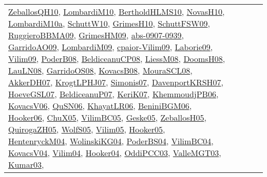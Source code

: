 {\begin{longtable}{lp{3cm}>{\raggedright}p{6cm}>{\raggedright}p{6cm}p{8cm}}
\href{articles/ZeballosQH10.pdf}{ZeballosQH10}\cite{ZeballosQH10}, \href{papers/LombardiM10.pdf}{LombardiM10}\cite{LombardiM10}, \href{papers/BertholdHLMS10.pdf}{BertholdHLMS10}\cite{BertholdHLMS10}, \href{articles/NovasH10.pdf}{NovasH10}\cite{NovasH10}, \href{articles/LombardiM10a.pdf}{LombardiM10a}\cite{LombardiM10a}, \href{papers/SchuttW10.pdf}{SchuttW10}\cite{SchuttW10}, \href{papers/GrimesH10.pdf}{GrimesH10}\cite{GrimesH10}, \href{papers/SchuttFSW09.pdf}{SchuttFSW09}\cite{SchuttFSW09}, \href{articles/RuggieroBBMA09.pdf}{RuggieroBBMA09}\cite{RuggieroBBMA09}, \href{papers/GrimesHM09.pdf}{GrimesHM09}\cite{GrimesHM09}, \href{articles/abs-0907-0939.pdf}{abs-0907-0939}\cite{abs-0907-0939}, \href{articles/GarridoAO09.pdf}{GarridoAO09}\cite{GarridoAO09}, \href{papers/LombardiM09.pdf}{LombardiM09}\cite{LombardiM09}, \href{papers/cpaior-Vilim09.pdf}{cpaior-Vilim09}\cite{cpaior-Vilim09}, \href{papers/Laborie09.pdf}{Laborie09}\cite{Laborie09}, \href{papers/Vilim09.pdf}{Vilim09}\cite{Vilim09}, \href{papers/PoderB08.pdf}{PoderB08}\cite{PoderB08}, \href{papers/BeldiceanuCP08.pdf}{BeldiceanuCP08}\cite{BeldiceanuCP08}, \href{articles/LiessM08.pdf}{LiessM08}\cite{LiessM08}, \href{papers/DoomsH08.pdf}{DoomsH08}\cite{DoomsH08}, \href{papers/LauLN08.pdf}{LauLN08}\cite{LauLN08}, \href{articles/GarridoOS08.pdf}{GarridoOS08}\cite{GarridoOS08}, \href{articles/KovacsB08.pdf}{KovacsB08}\cite{KovacsB08}, \href{papers/MouraSCL08.pdf}{MouraSCL08}\cite{MouraSCL08}, \href{papers/AkkerDH07.pdf}{AkkerDH07}\cite{AkkerDH07}, \href{papers/KrogtLPHJ07.pdf}{KrogtLPHJ07}\cite{KrogtLPHJ07}, \href{articles/Simonis07.pdf}{Simonis07}\cite{Simonis07}, \href{papers/DavenportKRSH07.pdf}{DavenportKRSH07}\cite{DavenportKRSH07}, \href{papers/HoeveGSL07.pdf}{HoeveGSL07}\cite{HoeveGSL07}, \href{papers/BeldiceanuP07.pdf}{BeldiceanuP07}\cite{BeldiceanuP07}, \href{papers/KeriK07.pdf}{KeriK07}\cite{KeriK07}, \href{papers/KhemmoudjPB06.pdf}{KhemmoudjPB06}\cite{KhemmoudjPB06}, \href{papers/KovacsV06.pdf}{KovacsV06}\cite{KovacsV06}, \href{papers/QuSN06.pdf}{QuSN06}\cite{QuSN06}, \href{articles/KhayatLR06.pdf}{KhayatLR06}\cite{KhayatLR06}, \href{papers/BeniniBGM06.pdf}{BeniniBGM06}\cite{BeniniBGM06}, \href{articles/Hooker06.pdf}{Hooker06}\cite{Hooker06}, \href{papers/ChuX05.pdf}{ChuX05}\cite{ChuX05}, \href{articles/VilimBC05.pdf}{VilimBC05}\cite{VilimBC05}, \href{papers/Geske05.pdf}{Geske05}\cite{Geske05}, \href{articles/ZeballosH05.pdf}{ZeballosH05}\cite{ZeballosH05}, \href{papers/QuirogaZH05.pdf}{QuirogaZH05}\cite{QuirogaZH05}, \href{papers/WolfS05.pdf}{WolfS05}\cite{WolfS05}, \href{papers/Vilim05.pdf}{Vilim05}\cite{Vilim05}, \href{articles/Hooker05.pdf}{Hooker05}\cite{Hooker05}, \href{papers/HentenryckM04.pdf}{HentenryckM04}\cite{HentenryckM04}, \href{papers/WolinskiKG04.pdf}{WolinskiKG04}\cite{WolinskiKG04}, \href{articles/PoderBS04.pdf}{PoderBS04}\cite{PoderBS04}, \href{papers/VilimBC04.pdf}{VilimBC04}\cite{VilimBC04}, \href{papers/KovacsV04.pdf}{KovacsV04}\cite{KovacsV04}, \href{papers/Vilim04.pdf}{Vilim04}\cite{Vilim04}, \href{papers/Hooker04.pdf}{Hooker04}\cite{Hooker04}, \href{papers/OddiPCC03.pdf}{OddiPCC03}\cite{OddiPCC03}, \href{papers/ValleMGT03.pdf}{ValleMGT03}\cite{ValleMGT03}, \href{papers/Kumar03.pdf}{Kumar03}\cite{Kumar03}, 
\end{longtable}}
